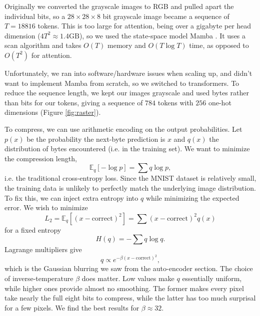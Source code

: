 \documentclass[11pt]{article}
\begin{document}
Originally we converted the grayscale images to RGB and pulled apart the individual bits, so a $28\times 28\times 8$ bit grayscale image became a sequence of $T=18816$ tokens. This is too large for attention, being over a gigabyte per head dimension ($4T^2\approx 1.4\mathrm{GB}$), so we used the state-space model Mamba \citep{gu-2023-mamba}. It uses a scan algorithm and takes $O(T)$ memory and $O(T\log T)$ time, as opposed to $O(T^2)$ for attention.

Unfortunately, we ran into software/hardware issues when scaling up, and didn't want to implement Mamba from scratch, so we switched to transformers. To reduce the sequence length, we kept our images grayscale and used bytes rather than bits for our tokens, giving a sequence of $784$ tokens with $256$ one-hot dimensions (Figure \ref{fig:raster}).

To compress, we can use arithmetic encoding on the output probabilities. Let $p(x)$ be the probability the next-byte prediction is $x$ and $q(x)$ the distribution of bytes encountered (i.e. in the training set). We want to minimize the compression length,
$$\mathbb{E}_q[-\log p] = \sum q\log p,$$
i.e. the traditional cross-entropy loss. Since the MNIST dataset is relatively small, the training data is unlikely to perfectly match the underlying image distribution. To fix this, we can inject extra entropy into $q$ while minimizing the expected error. We wish to minimize
$$L_2 = \mathbb{E}_q[(x-\mathrm{correct})^2] = \sum (x-\mathrm{correct})^2q(x)$$
for a fixed entropy
$$H(q) = -\sum q\log q.$$
Lagrange multipliers give
$$q\propto e^{-\beta(x-\mathrm{correct})^2},$$
which is the Gaussian blurring we saw from the auto-encoder section. The choice of inverse-temperature $\beta$ does matter. Low values make $q$ essentially uniform, while higher ones provide almost no smoothing. The former makes every pixel take nearly the full eight bits to compress, while the latter has too much surprisal for a few pixels. We find the best results for $\beta\approx 32$.
\end{document}
